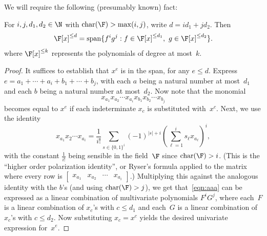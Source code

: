 \documentclass[11pt]{article}
\begin{document}
We will require the following (presumably known) fact:
\begin{lemma}\label{lem:powerspan}
    For $i,j,d_1,d_2 \in \N$ with $\mathrm{char}(\F) > \max(i,j)$, write $d = i d_1 + j d_2$. Then 
    \[
        \F[x]^{\leq d} = \mathrm{span}\{ f^i g^j : f \in \F[x]^{\leq d_1},\ g \in \F[x]^{\leq d_2}\}.
    \]
    where $\F[x]^{\leq k}$ represents the polynomials of degree at most~$k$.
\end{lemma}
\begin{proof}
It suffices to establish that $x^e$ is in the span, for any $e \leq d$.
Express $e = a_1 + \cdots + a_i + b_1 + \cdots + b_j$, with each $a$ being a natural number at most~$d_1$ and each $b$ being a natural number at most~$d_2$.
Now note that the monomial
\begin{equation} \label{eqn:aaa}
    x_{a_1} x_{a_2} \cdots x_{a_i} x_{b_1} x_{b_2} \cdots x_{b_j}
\end{equation}
becomes equal to $x^e$ if each indeterminate $x_c$ is substituted with~$x^c$.
Next, we use the identity
\[
    x_{a_1} x_2 \cdots x_{a_i} = \frac{1}{i!} \sum_{s \in \{0,1\}^i } (-1)^{|s|+i} \left (\sum_{\ell=1}^i s_\ell x_{a_\ell} \right)^i,
\]
with the constant $\frac{1}{i!}$ being sensible in the field~$\F$ since $\mathrm{char}(\F) > i$.
(This is the ``higher order polarization identity'', or Ryser's formula applied to the matrix where every row is $\begin{bmatrix} x_{a_1} & x_{a_2} & \cdots & x_{a_i} \end{bmatrix}$.)
Multiplying this against the analogous identity with the $b$'s (and using $\mathrm{char}(\F) > j$), we get that~\eqref{eqn:aaa} can be expressed as a linear combination of multivariate polynomials $F^i G^j$, where each~$F$ is a linear combination of $x_c$'s with $c \leq d_1$ and each~$G$ is a linear combination of $x_c$'s with $c \leq d_2$.
Now substituting $x_c = x^c$ yields the desired univariate expression for~$x^e$.
%
%
%
\end{proof}
\end{document}
